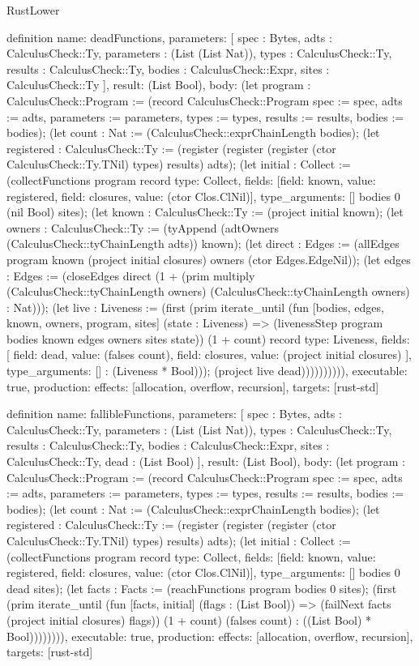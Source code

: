 \begin{lexlean}{RustLower}
\begin{semanticmodule}
definition{
  name: deadFunctions,
  parameters: [
    spec : Bytes,
    adts : CalculusCheck::Ty,
    parameters : (List (List Nat)),
    types : CalculusCheck::Ty,
    results : CalculusCheck::Ty,
    bodies : CalculusCheck::Expr,
    sites : CalculusCheck::Ty
  ],
  result: (List Bool),
  body: (let program : CalculusCheck::Program := (record CalculusCheck::Program {spec := spec, adts := adts, parameters := parameters, types := types, results := results, bodies := bodies}); (let count : Nat := (CalculusCheck::exprChainLength bodies); (let registered : CalculusCheck::Ty := (register (register (register (ctor CalculusCheck::Ty.TNil) types) results) adts); (let initial : Collect := (collectFunctions program record{
    type: Collect,
    fields: [{field: known, value: registered}, {field: closures, value: (ctor Clos.ClNil)}],
    type_arguments: []
  } bodies 0 (nil Bool) sites); (let known : CalculusCheck::Ty := (project initial known); (let owners : CalculusCheck::Ty := (tyAppend (adtOwners (CalculusCheck::tyChainLength adts)) known); (let direct : Edges := (allEdges program known (project initial closures) owners (ctor Edges.EdgeNil)); (let edges : Edges := (closeEdges direct (1 + (prim multiply (CalculusCheck::tyChainLength owners) (CalculusCheck::tyChainLength owners) : Nat))); (let live : Liveness := (first (prim iterate_until (fun [bodies, edges, known, owners, program, sites] (state : Liveness) => (livenessStep program bodies known edges owners sites state)) (1 + count) record{
    type: Liveness,
    fields: [
      {field: dead, value: (falses count)},
      {field: closures, value: (project initial closures)}
    ],
    type_arguments: []
  } : (Liveness * Bool))); (project live dead)))))))))),
  executable: true,
  production: {effects: [allocation, overflow, recursion], targets: [rust-std]}
}

definition{
  name: fallibleFunctions,
  parameters: [
    spec : Bytes,
    adts : CalculusCheck::Ty,
    parameters : (List (List Nat)),
    types : CalculusCheck::Ty,
    results : CalculusCheck::Ty,
    bodies : CalculusCheck::Expr,
    sites : CalculusCheck::Ty,
    dead : (List Bool)
  ],
  result: (List Bool),
  body: (let program : CalculusCheck::Program := (record CalculusCheck::Program {spec := spec, adts := adts, parameters := parameters, types := types, results := results, bodies := bodies}); (let count : Nat := (CalculusCheck::exprChainLength bodies); (let registered : CalculusCheck::Ty := (register (register (register (ctor CalculusCheck::Ty.TNil) types) results) adts); (let initial : Collect := (collectFunctions program record{
    type: Collect,
    fields: [{field: known, value: registered}, {field: closures, value: (ctor Clos.ClNil)}],
    type_arguments: []
  } bodies 0 dead sites); (let facts : Facts := (reachFunctions program bodies 0 sites); (first (prim iterate_until (fun [facts, initial] (flags : (List Bool)) => (failNext facts (project initial closures) flags)) (1 + count) (falses count) : ((List Bool) * Bool)))))))),
  executable: true,
  production: {effects: [allocation, overflow, recursion], targets: [rust-std]}
}


\end{semanticmodule}
\end{lexlean}
